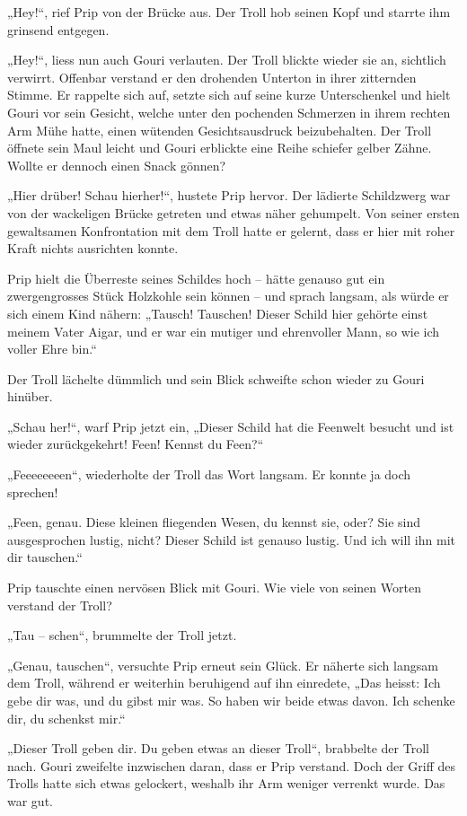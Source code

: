 \documentclass[10pt, a4paper, oneside]{book}
\begin{document}
„Hey!“, rief Prip von der Brücke aus. Der Troll hob seinen Kopf und starrte ihm grinsend entgegen.

„Hey!“, liess nun auch Gouri verlauten. Der Troll blickte wieder sie an, sichtlich verwirrt. Offenbar verstand er den drohenden Unterton in ihrer zitternden Stimme. Er rappelte sich auf, setzte sich auf seine kurze Unterschenkel und hielt Gouri vor sein Gesicht, welche unter den pochenden Schmerzen in ihrem rechten Arm Mühe hatte, einen wütenden Gesichtsausdruck beizubehalten. Der Troll öffnete sein Maul leicht und Gouri erblickte eine Reihe schiefer gelber Zähne. Wollte er dennoch einen Snack gönnen?

„Hier drüber! Schau hierher!“, hustete Prip hervor. Der lädierte Schildzwerg war von der wackeligen Brücke getreten und etwas näher gehumpelt. Von seiner ersten gewaltsamen Konfrontation mit dem Troll hatte er gelernt, dass er hier mit roher Kraft nichts ausrichten konnte.

Prip hielt die Überreste seines Schildes hoch – hätte genauso gut ein zwergengrosses Stück Holzkohle sein können – und sprach langsam, als würde er sich einem Kind nähern: „Tausch! Tauschen! Dieser Schild hier gehörte einst meinem Vater Aigar, und er war ein mutiger und ehrenvoller Mann, so wie ich voller Ehre bin.“

Der Troll lächelte dümmlich und sein Blick schweifte schon wieder zu Gouri hinüber.

„Schau her!“, warf Prip jetzt ein, „Dieser Schild hat die Feenwelt besucht und ist wieder zurückgekehrt! Feen! Kennst du Feen?“

„Feeeeeeeen“, wiederholte der Troll das Wort langsam. Er konnte ja doch sprechen!

„Feen, genau. Diese kleinen fliegenden Wesen, du kennst sie, oder? Sie sind ausgesprochen lustig, nicht? Dieser Schild ist genauso lustig. Und ich will ihn mit dir tauschen.“

Prip tauschte einen nervösen Blick mit Gouri. Wie viele von seinen Worten verstand der Troll?

„Tau – schen“, brummelte der Troll jetzt.

„Genau, tauschen“, versuchte Prip erneut sein Glück. Er näherte sich langsam dem Troll, während er weiterhin beruhigend auf ihn einredete, „Das heisst: Ich gebe dir was, und du gibst mir was. So haben wir beide etwas davon. Ich schenke dir, du schenkst mir.“

„Dieser Troll geben dir. Du geben etwas an dieser Troll“, brabbelte der Troll nach. Gouri zweifelte inzwischen daran, dass er Prip verstand. Doch der Griff des Trolls hatte sich etwas gelockert, weshalb ihr Arm weniger verrenkt wurde. Das war gut.
\end{document}
